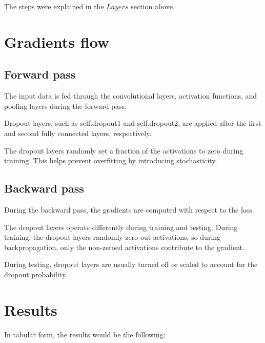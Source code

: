 \documentclass[conference]{IEEEtran}
\begin{document}
The steps were explained in the $Layers$ section above.

\section{Gradients flow}

\subsection{Forward pass}
The input data is fed through the convolutional layers, activation functions, and pooling layers during the forward pass.

Dropout layers, such as self.dropout1 and self.dropout2, are applied after the first and second fully connected layers, respectively.

The dropout layers randomly set a fraction of the activations to zero during training. This helps prevent overfitting by
introducing stochasticity.

\subsection{Backward pass}
During the backward pass, the gradients are computed with respect to the loss.

The dropout layers operate differently during training and testing. During training, the dropout layers randomly zero out
activations, so during backpropagation, only the non-zeroed activations contribute to the gradient.

During testing, dropout layers are usually turned off or scaled to account for the dropout probability.

\section{Results}
In tabular form, the results would be the following:
\end{document}
